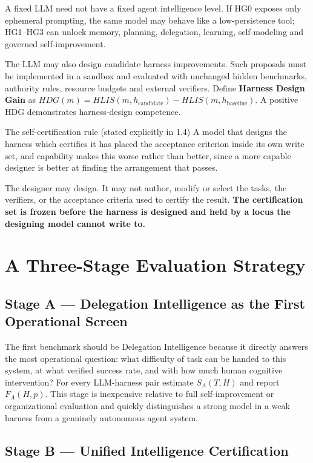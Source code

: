 \documentclass[11pt]{article}
\theoremstyle{definition}
\newcommand{\SA}{\ensuremath{S_A(T,H)}}
\newcommand{\FA}{\ensuremath{F_A(H,p)}}
\begin{document}
A fixed LLM need not have a fixed agent intelligence level. If HG0 exposes only ephemeral prompting, the same model may behave like a low-persistence tool; HG1--HG3 can unlock memory, planning, delegation, learning, self-modeling and governed self-improvement.

The LLM may also design candidate harness improvements. Such proposals must be implemented in a sandbox and evaluated with unchanged hidden benchmarks, authority rules, resource budgets and external verifiers. Define \textbf{Harness Design Gain} as $HDG(m) = HLIS(m,h_{\text{candidate}}) - HLIS(m,h_{\text{baseline}})$. A positive HDG demonstrates harness-design competence.

\begin{cautionbox}{The self-certification rule (stated explicitly in 1.4)}
A model that designs the harness which certifies it has placed the acceptance criterion inside its own write set, and capability makes this worse rather than better, since a more capable designer is better at finding the arrangement that passes.

The designer may design. It may not author, modify or select the tasks, the verifiers, or the acceptance criteria used to certify the result. \textbf{The certification set is frozen before the harness is designed and held by a locus the designing model cannot write to.}
\end{cautionbox}

\section{A Three-Stage Evaluation Strategy}

\subsection{Stage A --- Delegation Intelligence as the First Operational Screen}

The first benchmark should be Delegation Intelligence because it directly answers the most operational question: what difficulty of task can be handed to this system, at what verified success rate, and with how much human cognitive intervention? For every LLM-harness pair estimate \SA{} and report \FA{}. This stage is inexpensive relative to full self-improvement or organizational evaluation and quickly distinguishes a strong model in a weak harness from a genuinely autonomous agent system.

\subsection{Stage B --- Unified Intelligence Certification}
\end{document}
